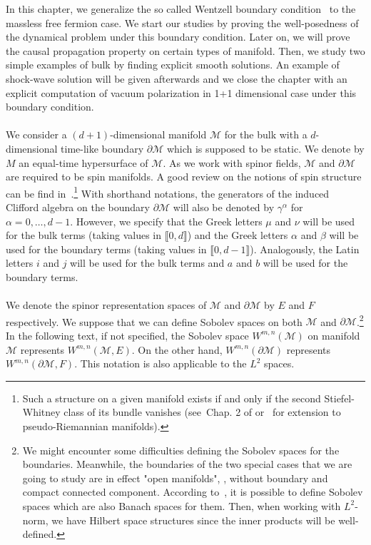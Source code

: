 In this chapter,
we generalize the so called Wentzell boundary condition~\cite{Zahn2016} to the massless free fermion case. 
We start our studies by proving the well-posedness of the dynamical problem under this boundary condition. 
Later on, we will prove the causal propagation property on certain types of manifold.
Then, we study two simple examples of bulk by finding explicit smooth solutions.
An example of shock-wave solution will be given afterwards and we close the chapter with an explicit computation of vacuum polarization in 1+1 dimensional case under this boundary condition. 
\\\\
We consider a $(d+1)$-dimensional manifold $\mathcal{M}$ for the bulk with a $d$-dimensional time-like boundary $\partial \mathcal{M}$ which is supposed to be static.
We denote by $M$ an equal-time hypersurface of $\mathcal{M}$.
As we work with spinor fields, $\mathcal{M}$ and $\partial \mathcal{M}$ are required to be spin manifolds. 
A good review on the notions of spin structure can be find in~\cite{Trautman2007}.\footnote{
Such a structure on a given manifold exists if and only if the second Stiefel-Whitney class of its bundle vanishes (see~\eg Chap. 2 of \cite{Lawson1989} or~\cite{Alagia1985} for extension to pseudo-Riemannian manifolds).}
%
With shorthand notations, the generators of the induced Clifford algebra on the boundary $\partial \mathcal{M}$ will also be denoted by $\gamma^\alpha$ for $\alpha = 0 ,\ldots, d-1$. 
However, we specify that the Greek letters $\mu$ and $\nu$ will be used for the bulk terms (taking values in $\llbracket 0, d \rrbracket$) and the Greek letters $\alpha$ and $\beta$ will be used for the boundary terms (taking values in $\llbracket 0, d-1 \rrbracket$).
Analogously, the Latin letters $i $ and $j$ will be used for the bulk terms and $a$ and $b$ will be used for the boundary terms. \\\\
%
We denote the spinor representation spaces of $\mathcal{M}$ and $\partial \mathcal{M}$ by $E$ and $F$ respectively.
We suppose that we can define Sobolev spaces on both $\mathcal{M}$ and $\partial\mathcal{M}$.\footnote{
We might encounter some difficulties defining the Sobolev spaces for the boundaries. Meanwhile, the boundaries of the two special cases that we are going to study are in effect "open manifolds", \ie, without boundary and compact connected component. 
According to~\cite{Eichhorn1996}, it is possible to define Sobolev spaces which are also Banach spaces for them.
Then, when working with $L^2$-norm, we have Hilbert space structures since the inner products will be well-defined.  
}
In the following text, if not specified, the Sobolev space $W^{m,n}(\mathcal{M})$ on manifold $\mathcal{M}$ represents $W^{m,n}(\mathcal{M}, E)$.
On the other hand, $W^{m,n}(\partial \mathcal{M})$ represents $W^{m,n}(\partial \mathcal{M}, F)$.
This notation is also applicable to the $L^2$ spaces.
%
